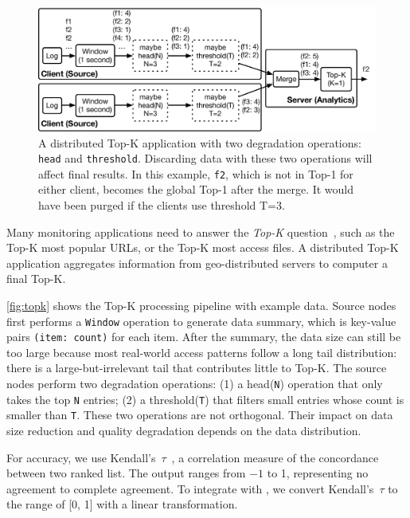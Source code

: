 \documentclass[twocolumn]{article}
\begin{document}
\begin{figure}
  \centering
  \includegraphics[width=\columnwidth]{figures/topk.pdf}
  \caption{A distributed Top-K application with two degradation operations:
    \texttt{head} and \texttt{threshold}. Discarding data with these two
    operations will affect final results. In this example, \texttt{f2}, which is
    not in Top-1 for either client, becomes the global Top-1 after the merge. It
    would have been purged if the clients use threshold T=3.}
  \label{fig:topk}
\end{figure}

 Many monitoring applications need to answer the
\textit{Top-K} question~\cite{babcock2003distributed}, such as the Top-K most
popular URLs, or the Top-K most access files. A distributed Top-K application
aggregates information from geo-distributed servers to computer a final Top-K.

\autoref{fig:topk} shows the Top-K processing pipeline with example data. Source
nodes first performs a \texttt{Window} operation to generate data summary, which
is key-value pairs \texttt{(item: count)} for each item. After the summary, the
data size can still be too large because most real-world access patterns follow
a long tail distribution: there is a large-but-irrelevant tail that contributes
little to Top-K. The source nodes perform two degradation operations: (1) a
head(\texttt{N}) operation that only takes the top \texttt{N} entries; (2) a
threshold(\texttt{T}) that filters small entries whose count is smaller than
\texttt{T}. These two operations are not orthogonal. Their impact on data size
reduction and quality degradation depends on the data distribution.

For accuracy, we use Kendall's~$\tau$~\cite{abdi2007kendall}, a correlation
measure of the concordance between two ranked list. The output ranges from
\(-1\) to 1, representing no agreement to complete agreement. To integrate with
\sysname{}, we convert Kendall's~$\tau$ to the range of [0, 1] with a linear
transformation.
\end{document}
